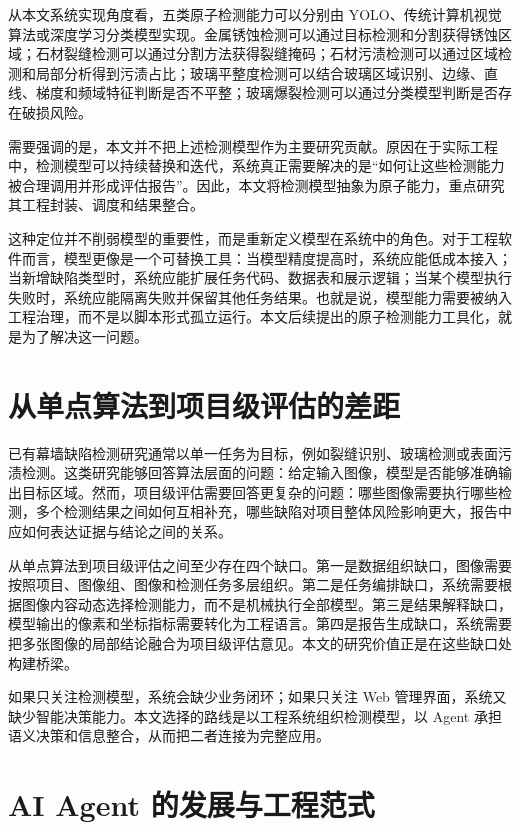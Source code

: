 从本文系统实现角度看，五类原子检测能力可以分别由 YOLO、传统计算机视觉算法或深度学习分类模型实现。金属锈蚀检测可以通过目标检测和分割获得锈蚀区域；石材裂缝检测可以通过分割方法获得裂缝掩码；石材污渍检测可以通过区域检测和局部分析得到污渍占比；玻璃平整度检测可以结合玻璃区域识别、边缘、直线、梯度和频域特征判断是否不平整；玻璃爆裂检测可以通过分类模型判断是否存在破损风险。

需要强调的是，本文并不把上述检测模型作为主要研究贡献。原因在于实际工程中，检测模型可以持续替换和迭代，系统真正需要解决的是“如何让这些检测能力被合理调用并形成评估报告”。因此，本文将检测模型抽象为原子能力，重点研究其工程封装、调度和结果整合。

这种定位并不削弱模型的重要性，而是重新定义模型在系统中的角色。对于工程软件而言，模型更像是一个可替换工具：当模型精度提高时，系统应能低成本接入；当新增缺陷类型时，系统应能扩展任务代码、数据表和展示逻辑；当某个模型执行失败时，系统应能隔离失败并保留其他任务结果。也就是说，模型能力需要被纳入工程治理，而不是以脚本形式孤立运行。本文后续提出的原子检测能力工具化，就是为了解决这一问题。

\section{从单点算法到项目级评估的差距}
\label{sec:related-algorithm-to-system}

已有幕墙缺陷检测研究通常以单一任务为目标，例如裂缝识别、玻璃检测或表面污渍检测。这类研究能够回答算法层面的问题：给定输入图像，模型是否能够准确输出目标区域。然而，项目级评估需要回答更复杂的问题：哪些图像需要执行哪些检测，多个检测结果之间如何互相补充，哪些缺陷对项目整体风险影响更大，报告中应如何表达证据与结论之间的关系。

从单点算法到项目级评估之间至少存在四个缺口。第一是数据组织缺口，图像需要按照项目、图像组、图像和检测任务多层组织。第二是任务编排缺口，系统需要根据图像内容动态选择检测能力，而不是机械执行全部模型。第三是结果解释缺口，模型输出的像素和坐标指标需要转化为工程语言。第四是报告生成缺口，系统需要把多张图像的局部结论融合为项目级评估意见。本文的研究价值正是在这些缺口处构建桥梁。

如果只关注检测模型，系统会缺少业务闭环；如果只关注 Web 管理界面，系统又缺少智能决策能力。本文选择的路线是以工程系统组织检测模型，以 Agent 承担语义决策和信息整合，从而把二者连接为完整应用。

\section{AI Agent 的发展与工程范式}
\label{sec:related-agent-paradigm}

